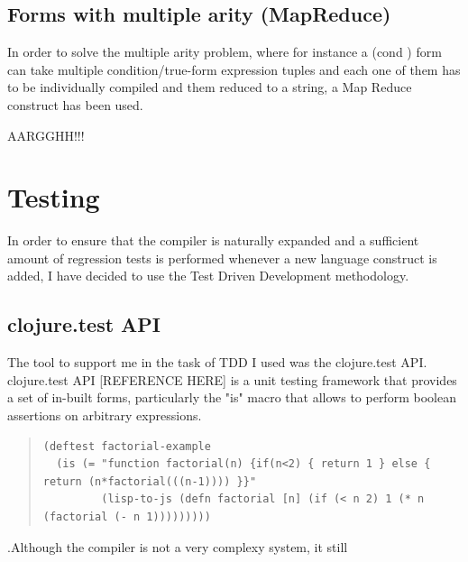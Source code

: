 \subsection{Forms with multiple arity (MapReduce)}

In order to solve the multiple arity problem, where for instance a (cond ) form can take multiple condition/true-form expression tuples and each one of them has to be individually compiled and them reduced to a string, a Map Reduce construct has been used. 

AARGGHH!!!

\section{Testing}
In order to ensure that the compiler is naturally expanded and a sufficient amount of regression tests is performed whenever a new language construct is added, I have decided to use the Test Driven Development methodology. 

\subsection{clojure.test API}
The tool to support me in the task of TDD I used was the clojure.test API.
clojure.test API [REFERENCE HERE] is a unit testing framework that provides a set of in-built forms, particularly the "is" macro that allows to perform boolean assertions on arbitrary expressions. 

\begin{quote}
\begin{verbatim}
(deftest factorial-example
  (is (= "function factorial(n) {if(n<2) { return 1 } else { return (n*factorial(((n-1)))) }}"
         (lisp-to-js (defn factorial [n] (if (< n 2) 1 (* n (factorial (- n 1)))))))))
\end{verbatim}
\end{quote}

.Although the compiler is not a very complexy system, it still 